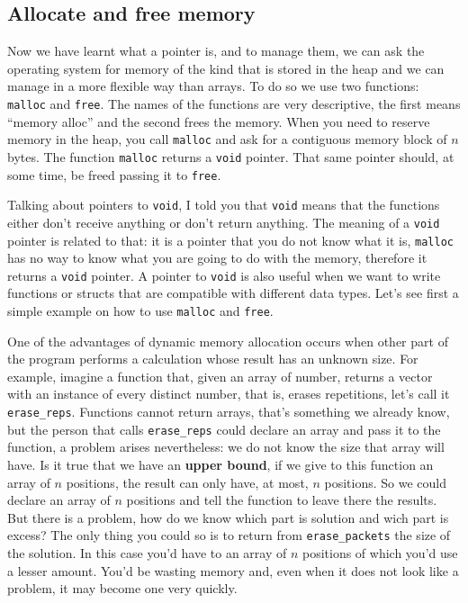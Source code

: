 \documentclass[a4paper]{article}
\begin{document}
\subsection{Allocate and free memory}
Now we have learnt what a pointer is, and to manage them, we can ask the
operating system for memory of the kind that is stored in the heap and we can
manage in a more flexible way than arrays. To do so we use two functions:
\verb!malloc! and \verb!free!. The names of the functions are very descriptive,
the first means ``memory alloc'' and the second frees the memory. When you need
to reserve memory in the heap, you call \texttt{malloc} and ask for a contiguous
memory block of $n$ bytes. The function \verb!malloc! returns a \verb!void!
pointer. That same pointer should, at some time, be freed passing it to
\texttt{free}.

Talking about pointers to \verb!void!, I told you that \verb!void! means that
the functions either don't receive anything or don't return anything. The
meaning of a \verb!void! pointer is related to that: it is a pointer that you do
not know what it is, \verb!malloc! has no way to know what you are going to do
with the memory, therefore it returns a \verb!void! pointer. A pointer to
\verb!void! is also useful when we want to write functions or structs that are
compatible with different data types. Let's see first a simple example on how to
use \verb!malloc! and \verb!free!.

One of the advantages of dynamic memory allocation occurs when other part of
the program performs a calculation whose result has an unknown size. For
example, imagine a function that, given an array of number, returns a vector
with an instance of every distinct number, that is, erases repetitions, let's
call it \verb!erase_reps!. Functions cannot return arrays, that's something we
already know, but the person that calls \verb!erase_reps! could declare an array
and pass it to the function, a problem arises nevertheless: we do not know
the size that array will have. Is it true that we have an \textbf{upper bound},
if we give to this function an array of $n$ positions, the result can only have,
at most, $n$ positions. So we could declare an array of $n$ positions
and tell the function to leave there the results. But there is a problem, how do
we know which part is solution and wich part is excess? The only thing you could
so is to return from \verb!erase_packets! the size of the solution. In this case
you'd have to an array of $n$ positions of which you'd use a lesser amount.
You'd be wasting memory and, even when it does not look like a problem, it may
become one very quickly.
\end{document}
